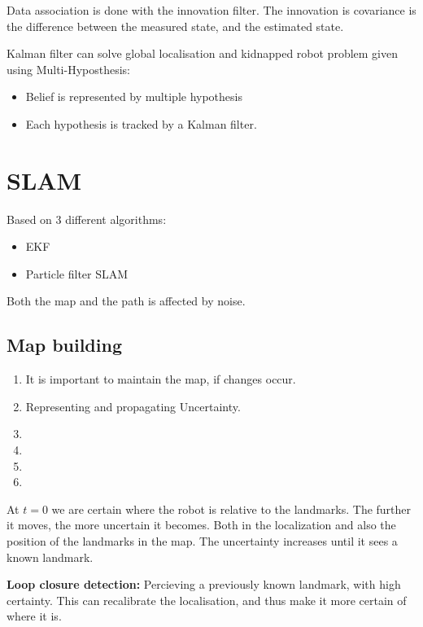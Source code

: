 \documentclass[a4paper]{article}
\begin{document}
Data association is done with the innovation filter. The innovation is covariance is the difference between the measured state, and the estimated state.

Kalman filter can solve global localisation and kidnapped robot problem given using Multi-Hyposthesis:
\begin{itemize}
	\item Belief is represented by multiple hypothesis
	\item Each hypothesis is tracked by a Kalman filter.
\end{itemize}



\section{SLAM}
Based on 3 different algorithms:
\begin{itemize}
	\item EKF
	\item Particle filter SLAM
\end{itemize}


Both the map and the path is affected by noise.


\subsection{Map building}

\begin{enumerate}
	\item It is important to maintain the map, if changes occur. 
	\item Representing and propagating Uncertainty.
	\item 
	\item 
	\item 
	\item 
\end{enumerate}

At $ t=0 $ we are certain where the robot is relative to the landmarks. The further it moves, the more uncertain it becomes. Both in the localization and also the position of the landmarks in the map. The uncertainty increases until it sees a known landmark. 

\vspace{5pt}

\textbf{Loop closure detection:} Percieving a previously known landmark, with high certainty. This can recalibrate the localisation, and thus make it more certain of where it is.  
\end{document}

